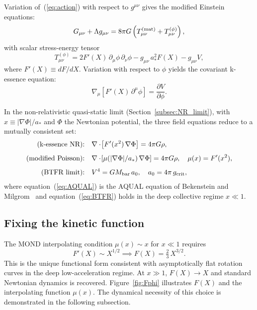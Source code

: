 \documentclass[11pt,a4paper]{article}
\begin{document}
Variation of~(\ref{eq:action}) with respect to $g^{\mu\nu}$ gives the modified Einstein
equations:
\begin{equation}
  G_{\mu\nu} + \Lambda g_{\mu\nu}
  = 8\pi G\left(T_{\mu\nu}^{(\rm mat)} + T_{\mu\nu}^{(\phi)}\right),
  \label{eq:einstein}
\end{equation}
with scalar stress-energy tensor
\begin{equation}
  T_{\mu\nu}^{(\phi)}
  = 2F'(X)\,\partial_\mu\phi\,\partial_\nu\phi
  - g_{\mu\nu}\,a_*^2 F(X)
  - g_{\mu\nu} V,
  \label{eq:Tphi}
\end{equation}
where $F'(X)\equiv dF/dX$. Variation with respect to $\phi$ yields the covariant
k-essence equation:
\begin{equation}
  \nabla_\mu\!\left[F'(X)\,\partial^\mu\phi\right] = \frac{\partial V}{\partial\phi}.
  \label{eq:kessence}
\end{equation}

In the non-relativistic quasi-static limit (Section~\ref{subsec:NR_limit}), with
$x \equiv |\nabla\Phi|/a_*$ and $\Phi$ the Newtonian potential, the three field
equations reduce to a mutually consistent set:
\begin{align}
  \text{(k-essence NR):}\quad &\nabla\cdot\!\left[F'(x^2)\,\nabla\Phi\right] = 4\pi G\rho,
  \label{eq:NR_kessence}\\[4pt]
  \text{(modified Poisson):}\quad &\nabla\cdot\!\left[\mu(|\nabla\Phi|/a_*)\,\nabla\Phi\right]
  = 4\pi G\rho,\quad \mu(x) = F'(x^2),
  \label{eq:AQUAL}\\[4pt]
  \text{(BTFR limit):}\quad &V^4 = G M_{\rm bar}\,a_0,\quad a_0 = 4\pi\,g_{\rm crit},
  \label{eq:BTFR}
\end{align}
where equation~(\ref{eq:AQUAL}) is the AQUAL equation of Bekenstein and Milgrom~\cite{Bekenstein1984}
and equation~(\ref{eq:BTFR}) holds in the deep collective regime $x\ll 1$.

\subsection{Fixing the kinetic function}
\label{subsec:FX}

The MOND interpolating condition $\mu(x)\sim x$ for $x\ll 1$ requires
\begin{equation}
  F'(X)\sim X^{1/2} \implies F(X) = \tfrac{2}{3}\,X^{3/2}.
  \label{eq:F_AQUAL}
\end{equation}
This is the unique functional form consistent with asymptotically flat rotation curves
in the deep low-acceleration regime. At $x\gg 1$, $F(X)\to X$ and standard Newtonian
dynamics is recovered. Figure~\ref{fig:Fphi} illustrates $F(X)$ and the interpolating
function $\mu(x)$. The dynamical necessity of this choice is demonstrated in the
following subsection.
\end{document}
